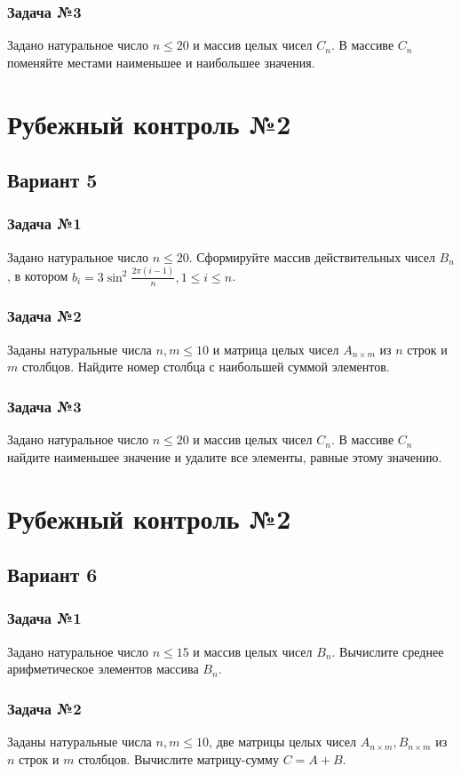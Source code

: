 \documentclass[12pt,a5paper,landscape]{report}
\begin{document}
\subsubsection*{Задача №3}
Задано натуральное число $n \le 20$ и массив целых чисел $C_n$. В массиве $C_n$ поменяйте местами наименьшее и наибольшее значения.


\clearpage
\section*{Рубежный контроль №2}
\subsection*{Вариант 5}
\subsubsection*{Задача №1}
Задано натуральное число $n \le 20$. Сформируйте массив действительных чисел $B_n$, в котором $b_i = 3 \sin^2 { \frac {2\pi(i-1)} {n} }, 1 \le i \le n$.
\subsubsection*{Задача №2}
Заданы натуральные числа $n, m \le 10$ и матрица целых чисел $A_{n \times m}$ из $n$ строк и $m$ столбцов. Найдите номер столбца с наибольшей суммой элементов.
\subsubsection*{Задача №3}
Задано натуральное число $n \le 20$ и массив целых чисел $C_n$. В массиве $C_n$ найдите наименьшее значение и удалите все элементы, равные этому значению.


\clearpage
\section*{Рубежный контроль №2}
\subsection*{Вариант 6}
\subsubsection*{Задача №1}
Задано натуральное число $n \le 15$ и массив целых чисел $B_n$. Вычислите среднее арифметическое элементов массива $B_n$.
\subsubsection*{Задача №2}
Заданы натуральные числа $n, m \le 10$, две матрицы целых чисел $A_{n \times m}, B_{n \times m}$ из $n$ строк и $m$ столбцов. Вычислите матрицу-сумму $C = A + B$.
\end{document}
